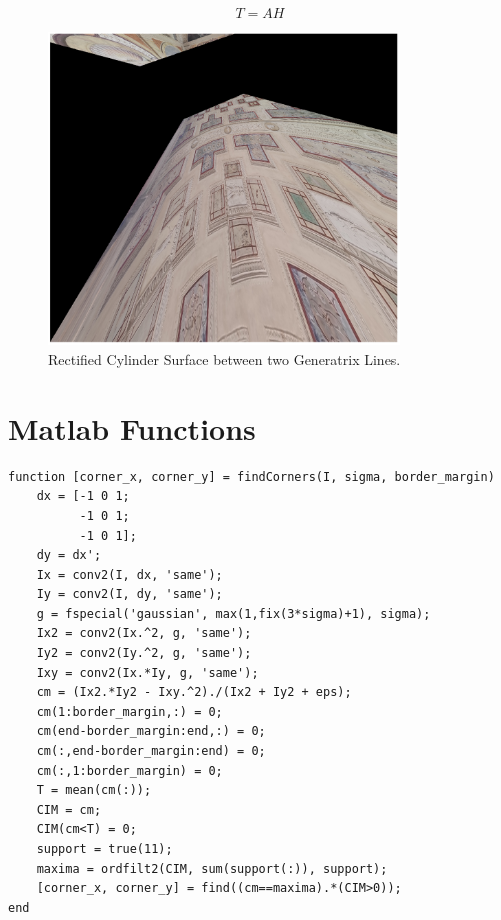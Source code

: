 \documentclass[12pt,a4paper]{article}
\begin{document}
\begin{equation}
    T = AH
    \label{eq:tMatrix}
\end{equation}

\begin{figure}[H]
    \centering
    \includegraphics[width=0.83\textwidth]{Images/PalazzoTe_rectified.png}
    \caption[Rectified Cylinder Surface between two Generatrix Lines.]{Rectified Cylinder Surface between two Generatrix Lines.}
    \label{fig:rectified}
\end{figure}

\pagebreak

\section*{Matlab Functions}

\begin{verbatim}
function [corner_x, corner_y] = findCorners(I, sigma, border_margin)
    dx = [-1 0 1; 
          -1 0 1; 
          -1 0 1];
    dy = dx';
    Ix = conv2(I, dx, 'same');
    Iy = conv2(I, dy, 'same');
    g = fspecial('gaussian', max(1,fix(3*sigma)+1), sigma);
    Ix2 = conv2(Ix.^2, g, 'same');
    Iy2 = conv2(Iy.^2, g, 'same');
    Ixy = conv2(Ix.*Iy, g, 'same');
    cm = (Ix2.*Iy2 - Ixy.^2)./(Ix2 + Iy2 + eps);
    cm(1:border_margin,:) = 0;
    cm(end-border_margin:end,:) = 0;
    cm(:,end-border_margin:end) = 0;
    cm(:,1:border_margin) = 0;
    T = mean(cm(:));
    CIM = cm;
    CIM(cm<T) = 0;
    support = true(11);
    maxima = ordfilt2(CIM, sum(support(:)), support);
    [corner_x, corner_y] = find((cm==maxima).*(CIM>0));
end
\end{verbatim}
\end{document}
